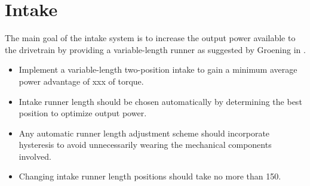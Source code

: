 \section{Intake}

The main goal of the intake system is to increase the output power available to the drivetrain by providing a variable-length runner as suggested by Groening in \cite{LucasIntake}.

\begin{itemize}

\item Implement a variable-length two-position intake to gain a minimum average power advantage of \unit{xxx}{\newton\metre} of torque.
\item Intake runner length should be chosen automatically by determining the best position to optimize output power.
\item Any automatic runner length adjustment scheme should incorporate hysteresis to avoid unnecessarily wearing the mechanical components involved.
\item Changing intake runner length positions should take no more than \unit{150}{\milli\second}.

\end{itemize}
